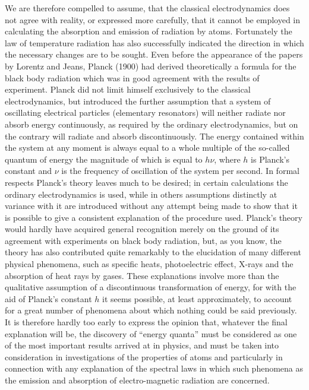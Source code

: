 We are therefore compelled to assume, that the classical electrodynamics
does not agree with reality, or expressed more carefully, that it cannot
be employed in calculating the absorption and emission of radiation by
atoms. Fortunately the law of temperature radiation has also
successfully indicated the direction in which the necessary changes are
to be sought. Even before the appearance of the papers by Lorentz and
Jeans, Planck (1900) had derived theoretically a formula for the black
body radiation which was in good agreement with the results of
experiment. Planck did not limit himself exclusively to the classical
electrodynamics, but introduced the further assumption that a system of
oscillating electrical particles (elementary resonators) will neither
radiate nor absorb energy continuously, as required by the ordinary
electrodynamics, but on the contrary will radiate and absorb
discontinuously. The energy contained within the system at any moment 
is always equal to a whole multiple of the so-called quantum of energy 
the magnitude of which is equal to
$h\nu$, where $h$ is Planck's constant and $\nu$ is the
frequency of oscillation of the system per second. In formal respects 
Planck's theory leaves much to be desired; in certain calculations the ordinary
electrodynamics is used, while in others assumptions distinctly at
variance with it are introduced without any attempt being made to show
that it is possible to give a consistent explanation of the procedure
used. Planck's theory would hardly have acquired general recognition
merely on the ground of its agreement with experiments on black body
radiation, but, as you know, the theory has also contributed quite
remarkably to the elucidation of many different physical phenomena, such
as specific heats, photoelectric effect, X-rays and the absorption of
heat rays by gases. These explanations involve more than the qualitative
assumption of a discontinuous transformation of energy, for with the aid
of Planck's constant $h$ it seems possible, at least approximately,
to account for a great number of phenomena about which nothing could be
said previously. It is therefore hardly too early to express the opinion
that, whatever the final explanation will be, the discovery of ``energy
quanta'' must be considered as one of the most important results arrived
at in physics, and must be taken into consideration in investigations of
the properties of atoms and particularly in connection with any
explanation of the spectral laws in which such phenomena as the emission
and absorption of electro-magnetic radiation are concerned.

